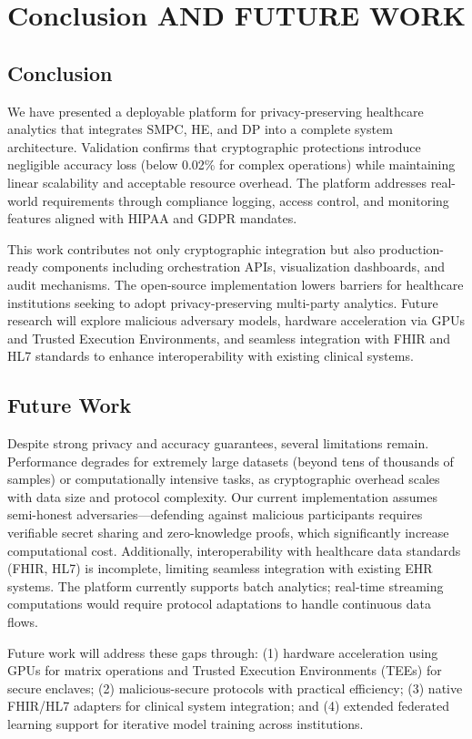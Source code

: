 \documentclass[conference]{IEEEtran}
\begin{document}
\section{Conclusion AND FUTURE WORK}
\subsection{Conclusion}
We have presented a deployable platform for privacy-preserving healthcare analytics that integrates SMPC, HE, and DP into a complete system architecture. Validation confirms that cryptographic protections introduce negligible accuracy loss (below 0.02\% for complex operations) while maintaining linear scalability and acceptable resource overhead. The platform addresses real-world requirements through compliance logging, access control, and monitoring features aligned with HIPAA and GDPR mandates.

This work contributes not only cryptographic integration but also production-ready components including orchestration APIs, visualization dashboards, and audit mechanisms. The open-source implementation lowers barriers for healthcare institutions seeking to adopt privacy-preserving multi-party analytics. Future research will explore malicious adversary models, hardware acceleration via GPUs and Trusted Execution Environments, and seamless integration with FHIR and HL7 standards to enhance interoperability with existing clinical systems.

\subsection{Future Work}
Despite strong privacy and accuracy guarantees, several limitations remain. Performance degrades for extremely large datasets (beyond tens of thousands of samples) or computationally intensive tasks, as cryptographic overhead scales with data size and protocol complexity. Our current implementation assumes semi-honest adversaries—defending against malicious participants requires verifiable secret sharing and zero-knowledge proofs, which significantly increase computational cost. Additionally, interoperability with healthcare data standards (FHIR, HL7) is incomplete, limiting seamless integration with existing EHR systems. The platform currently supports batch analytics; real-time streaming computations would require protocol adaptations to handle continuous data flows.

Future work will address these gaps through: (1) hardware acceleration using GPUs for matrix operations and Trusted Execution Environments (TEEs) for secure enclaves; (2) malicious-secure protocols with practical efficiency; (3) native FHIR/HL7 adapters for clinical system integration; and (4) extended federated learning support for iterative model training across institutions.
\end{document}
